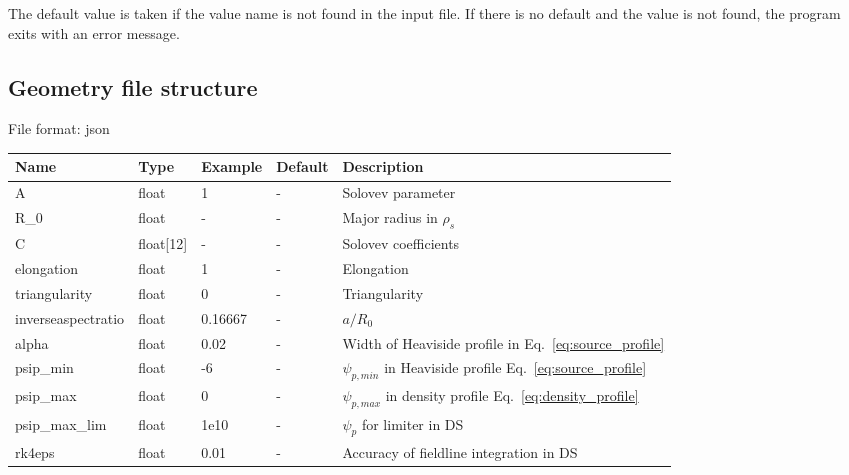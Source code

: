 The default value is taken if the value name is not found in the input file. If there is no default and
the value is not found,
the program exits with an error message.

\subsection{Geometry file structure}
File format: json

\begin{longtable}{llll>{\RaggedRight}p{7cm}}
\toprule
\rowcolor{gray!50}\textbf{Name} &  \textbf{Type} & \textbf{Example} & \textbf{Default} & \textbf{Description}  \\ \midrule
    A      & float & 1 &  - & Solovev parameter \\
    R\_0   & float & - & -  & Major radius in $\rho_s$ \\
    C      & float[12] &  - & - & Solovev coefficients \\
    elongation & float & 1 & - & Elongation \\
    triangularity & float & 0 & - & Triangularity \\
    inverseaspectratio & float & 0.16667 & - & $a/R_0$ \\
    alpha  & float & 0.02 & - & Width of Heaviside profile in Eq.~\eqref{eq:source_profile} \\
    psip\_min & float & -6 & - & $\psi_{p,min}$ in Heaviside profile Eq.~\eqref{eq:source_profile} \\
    psip\_max & float & 0 & - & $\psi_{p,max}$ in density profile Eq.~\eqref{eq:density_profile} \\
    psip\_max\_lim & float & 1e10 & - & $\psi_p$ for limiter in DS \\
    rk4eps & float & 0.01 & - & Accuracy of fieldline integration in DS \\
\bottomrule
\end{longtable}

